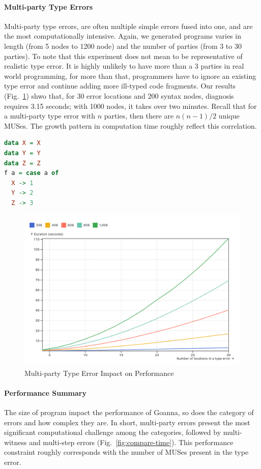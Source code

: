 \documentclass[pdflatex,sn-nature,Numbered]{sn-jnl}%
\begin{document}
\paragraph{Multi-party Type Errors}

Multi-party type errors, are often multiple simple errors fused into one, and are the most computationally intensive. Again, we generated programs varies in length (from 5 nodes to 1200 node) and the number of parties (from 3 to 30 parties). To note that this experiment does not mean to be representative of realistic type error. It is highly unlikely to have more than a 3 parties in real world programming, for more than that, programmers have to ignore an existing type error and continue adding more ill-typed code fragments. Our results (Fig.~\ref{fig:multi-party-time}) shwo that, for 30 error locations and 200 syntax nodes, diagnosis requires 3.15 seconds; with 1000 nodes, it takes over two minutes. Recall that for a multi-party type error with $n$ parties, then there are $n (n - 1) / 2$ unique MUSes. The growth pattern in computation time roughly reflect this correlation.

\begin{lstlisting}[language=Haskell, caption=Multi-party Haskell Example, label={lst:eval-multi-party}]
data X = X
data Y = Y
data Z = Z
f a = case a of
  X -> 1
  Y -> 2
  Z -> 3
\end{lstlisting}

\begin{figure}[ht]
    \centering
    \includegraphics[width=0.8\linewidth]{images/multi-party-time.png}
    \caption{Multi-party Type Error Impact on Performance}
    \label{fig:multi-party-time}
\end{figure}

\paragraph{Performance Summary}
The size of program impact the performance of Goanna, so does the category of errors and how complex they are. In short, multi-party errors present the most significant computational challenge among the categories, followed by multi-witness and multi-step errors (Fig.~\ref{fig:compare-time}). This performance constraint roughly corresponds with the number of MUSes present in the type error. 
\end{document}
